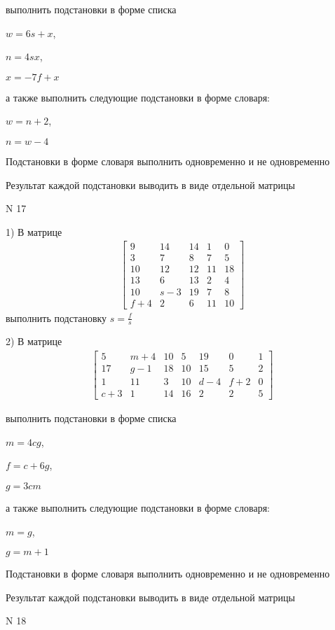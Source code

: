 \documentclass[11pt]{report}
\begin{document}
выполнить подстановки в форме списка

$w=6 s + x$,

$n=4 s x$,

$x=- 7 f + x$

а также выполнить следующие подстановки в форме словаря:

$w=n + 2$,

$n=w - 4$


    Подстановки в форме словаря выполнить одновременно и не одновременно


    Результат каждой подстановки выводить в виде отдельной матрицы

\newpage
N 17


    1) В матрице
\begin{align*}
\left[\begin{matrix}9 & 14 & 14 & 1 & 0\\3 & 7 & 8 & 7 & 5\\10 & 12 & 12 & 11 & 18\\13 & 6 & 13 & 2 & 4\\10 & s - 3 & 19 & 7 & 8\\f + 4 & 2 & 6 & 11 & 10\end{matrix}\right]
\end{align*}
выполнить подстановку $s=\frac{f}{s}$


    2) В матрице
\begin{align*}
\left[\begin{matrix}5 & m + 4 & 10 & 5 & 19 & 0 & 1\\17 & g - 1 & 18 & 10 & 15 & 5 & 2\\1 & 11 & 3 & 10 & d - 4 & f + 2 & 0\\c + 3 & 1 & 14 & 16 & 2 & 2 & 5\end{matrix}\right]
\end{align*}

выполнить подстановки в форме списка

$m=4 c g$,

$f=c + 6 g$,

$g=3 c m$

а также выполнить следующие подстановки в форме словаря:

$m=g$,

$g=m + 1$


    Подстановки в форме словаря выполнить одновременно и не одновременно


    Результат каждой подстановки выводить в виде отдельной матрицы

\newpage
N 18
\end{document}
